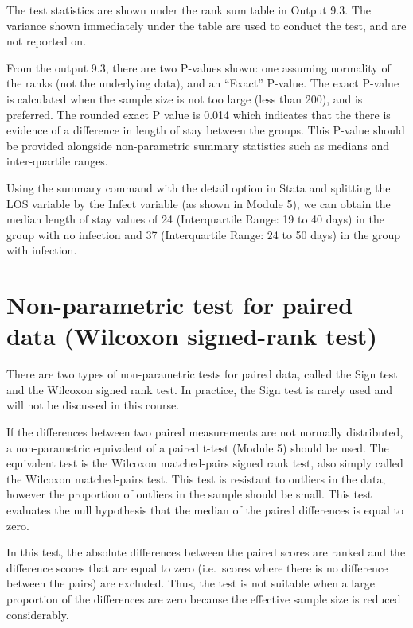 \documentclass[
]{memoir}
\begin{document}
The test statistics are shown under the rank sum table in Output 9.3. The variance shown immediately under the table are used to conduct the test, and are not reported on.

From the output 9.3, there are two P-values shown: one assuming normality of the ranks (not the underlying data), and an ``Exact'' P-value. The exact P-value is calculated when the sample size is not too large (less than 200), and is preferred. The rounded exact P value is 0.014 which indicates that the there is evidence of a difference in length of stay between the groups. This P-value should be provided alongside non-parametric summary statistics such as medians and inter-quartile ranges.

Using the summary command with the detail option in Stata and splitting the LOS variable by the Infect variable (as shown in Module 5), we can obtain the median length of stay values of 24 (Interquartile Range: 19 to 40 days) in the group with no infection and 37 (Interquartile Range: 24 to 50 days) in the group with infection.

\hypertarget{non-parametric-test-for-paired-data-wilcoxon-signed-rank-test}{%
\section{Non-parametric test for paired data (Wilcoxon signed-rank test)}\label{non-parametric-test-for-paired-data-wilcoxon-signed-rank-test}}

There are two types of non-parametric tests for paired data, called the Sign test and the Wilcoxon signed rank test. In practice, the Sign test is rarely used and will not be discussed in this course.

If the differences between two paired measurements are not normally distributed, a non-parametric equivalent of a paired t-test (Module 5) should be used. The equivalent test is the Wilcoxon matched-pairs signed rank test, also simply called the Wilcoxon matched-pairs test. This test is resistant to outliers in the data, however the proportion of outliers in the sample should be small. This test evaluates the null hypothesis that the median of the paired differences is equal to zero.

In this test, the absolute differences between the paired scores are ranked and the difference scores that are equal to zero (i.e.~scores where there is no difference between the pairs) are excluded. Thus, the test is not suitable when a large proportion of the differences are zero because the effective sample size is reduced considerably.
\end{document}

